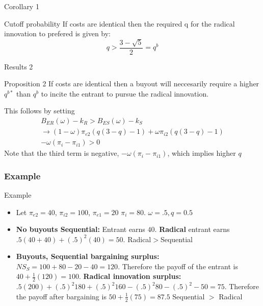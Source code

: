 \documentclass{beamer}
\numberwithin{equation}{section}
\begin{document}
\begin{frame}{Corollary 1}
\begin{block}{Cutoff probability}
If costs are identical then the required q for the radical innovation to prefered is given by: 
\begin{equation*}
q > \frac{3-\sqrt{5}}{2}=q^{b}
\end{equation*}
\end{block}
\end{frame}

\begin{frame}{Results 2}
\begin{block}{Proposition 2}
If costs are identical then a buyout will neccesarily require a higher $q^{b*}$ than $q^b$ to incite the entrant to pursue the radical innovation. 
\end{block}
This follows by setting 
\begin{align*}
B_{ER}(\omega)-k_R>B_{ES}(\omega)-k_S \\
\rightarrow (1-\omega) \pi_{e2}(q(3-q)-1)
+ \omega \pi_{i2} (q(3-q)-1) \\  -\omega(\pi_i- \pi_{i1})
> 0
\end{align*}
Note that the third term is negative, $-\omega(\pi_i- \pi_{i1})$, which implies higher $q$
\end{frame}

\subsubsection{Example}

\begin{frame}{Example}
\begin{itemize}
    \item Let $\pi_{e2}=40$, $\pi_{i2}=100$, $\pi_{e1}=20$ $\pi_{i}=80$. $\omega = .5, q=0.5$ \\
    \item \textbf{No buyouts Sequential:} Entrant earns $40$. \textbf{Radical} entrant earns $.5(40+40)+(.5)^2(40)=50$. \newline Radical$>$Sequential 
    \item \textbf{Buyouts, Sequential bargaining surplus:}  $NS_S = 100+80-20-40=120$. Therefore the payoff of the entrant is $40+\frac{1}{2}(120)=100$. \newline \textbf{Radical innovation surplus:} $ .5(200)+(.5)^2 180+(.5)^2 160-(.5)^2 80-(.5)^2-50=75$. Therefore the payoff after bargaining is $50+\frac{1}{2}(75)=87.5$ 
    \newline
    Sequential $>$ Radical
\end{itemize}
\end{frame}
\end{document}

